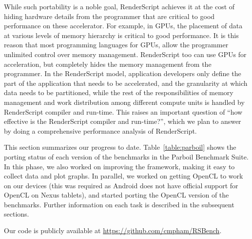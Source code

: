 While such portability is a noble goal, RenderScript achieves it at the cost of
hiding hardware details from the programmer that are critical to good
performance on these accelerator. For example, in GPUs, the placement of data at
various levels of memory hierarchy is critical to good performance.  It is this
reason that most programming languages for GPUs, allow the programmer unlimited
control over memory management. RenderScript too can use GPUs for acceleration,
but completely hides the memory management from the programmer. In the
RenderScript model, application developers only define the part of the
application that needs to be accelerated, and the granularity at which data
needs to be partitioned, while the rest of the responsibilities of memory
management and work distribution among different compute units is handled by
RenderScript compiler and run-time.  This raises an important question of ``how
effective is the RenderScript compiler and run-time?'', which we plan to answer
by doing a comprehensive performance analysis of RenderScript.

This section summarizes our progress to date. Table~\ref{table:parboil} shows the
porting status of each version of the benchmarks in the Parboil Benchmark Suite.
In this phase, we also worked on improving the framework, making it easy to collect
data and plot graphs. In parallel, we worked on getting OpenCL to work on our
devices (this was required as Android does not have official support for OpenCL
on Nexus tablets), and started porting the OpenCL version of the benchmarks. 
Further information on each task is described in the subsequent sections.

Our code is publicly available at \url{https://github.com/cmpham/RSBench}.


